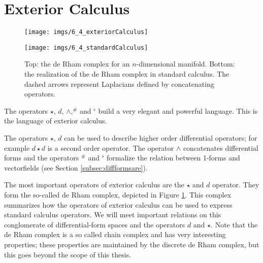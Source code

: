 \section{Exterior Calculus}

\begin{figure}[t]
\begin{center}
\texttt{[image: imgs/6\_4\_exteriorCalculus]}

\texttt{[image: imgs/6\_4\_standardCalculus]}
\end{center}
\caption{Top: the de Rham complex for an $n$-dimensional manifold. Bottom: the realization of the de Rham complex in standard calculus.  The dashed arrows represent Laplacians defined by concatenating operators.}
\label{fig::deRhamComplex}
\end{figure}

The operators $\star$, $d$, $\wedge$,$^\#$ and $^\flat$ build a very elegant and powerful language. This is the language of exterior calculus. 

The operators $\star$, $d$ can be used to describe higher order differential operators; for example $d\star d$ is a second order operator.
The operator $\wedge$ concatenates differential forms and the operators $^\#$ and $^\flat$ formalize the relation between 1-forms and vectorfields (see Section \ref{subsec:diffformsare}).

The most important operators of exterior calculus are the $\star$ and $d$ operator. They form the so-called de Rham complex, depicted in Figure \ref{fig::deRhamComplex}. 
This complex summarizes how the operators of exterior calculus can be used to express standard calculus operators. We will meet important relations on this conglomerate of differential-form spaces and the operators $d$ and $\star$.
Note that the de Rham complex is a so called chain complex and has very interesting properties; these properties are maintained by the discrete de Rham complex, but this goes beyond the scope of this thesis. %

